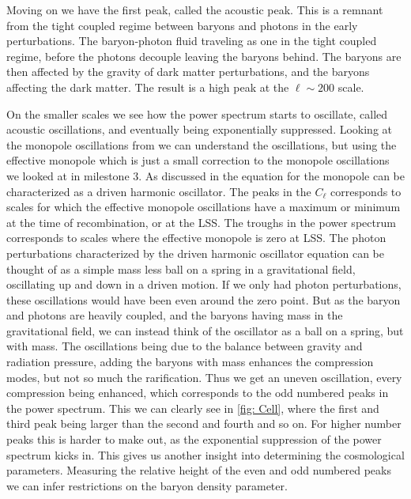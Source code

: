 \documentclass[10pt,a4paper]{article}
\begin{document}
Moving on we have the first peak, called the acoustic peak. This is a remnant from the tight coupled regime between baryons and photons in the early perturbations. The baryon-photon fluid traveling as one in the tight coupled regime, before the photons decouple leaving the baryons behind. The baryons are then affected by the gravity of dark matter perturbations, and the baryons affecting the dark matter. The result is a high peak at the $\ell\sim 200$ scale.

On the smaller scales we see how the power spectrum starts to oscillate, called acoustic oscillations, and eventually being exponentially suppressed. Looking at the monopole oscillations from \cite{milestone3} we can understand the oscillations, but using the effective monopole which is just a small correction to the monopole oscillations we looked at in milestone 3. As discussed in \cite{milestone3} the equation for the monopole can be characterized as a driven harmonic oscillator. The peaks in the $C_\ell$ corresponds to scales for which the effective monopole oscillations have a maximum or minimum at the time of recombination, or at the LSS. The troughs in the power spectrum corresponds to scales where the effective monopole is zero at LSS. The photon perturbations characterized by the driven harmonic oscillator equation can be thought of as a simple mass less ball on a spring in a gravitational field, oscillating up and down in a driven motion. If we only had photon perturbations, these oscillations would have been even around the zero point. But as the baryon and photons are heavily coupled, and the baryons having mass in the gravitational field, we can instead think of the oscillator as a ball on a spring, but with mass. The oscillations being due to the balance between gravity and radiation pressure, adding the baryons with mass enhances the compression modes, but not so much the rarification. Thus we get an uneven oscillation, every compression being enhanced, which corresponds to the odd numbered peaks in the power spectrum. This we can clearly see in \cref{fig: Cell}, where the first and third peak being larger than the second and fourth and so on. For higher number peaks this is harder to make out, as the exponential suppression of the power spectrum kicks in. This gives us another insight into determining the cosmological parameters. Measuring the relative height of the even and odd numbered peaks we can infer restrictions on the baryon density parameter.
\end{document}
